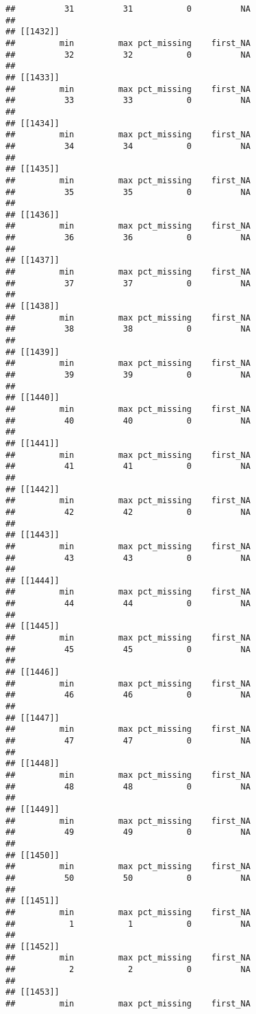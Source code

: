 \documentclass[
]{article}
\begin{document}
\begin{verbatim}
##          31          31           0          NA 
## 
## [[1432]]
##         min         max pct_missing    first_NA 
##          32          32           0          NA 
## 
## [[1433]]
##         min         max pct_missing    first_NA 
##          33          33           0          NA 
## 
## [[1434]]
##         min         max pct_missing    first_NA 
##          34          34           0          NA 
## 
## [[1435]]
##         min         max pct_missing    first_NA 
##          35          35           0          NA 
## 
## [[1436]]
##         min         max pct_missing    first_NA 
##          36          36           0          NA 
## 
## [[1437]]
##         min         max pct_missing    first_NA 
##          37          37           0          NA 
## 
## [[1438]]
##         min         max pct_missing    first_NA 
##          38          38           0          NA 
## 
## [[1439]]
##         min         max pct_missing    first_NA 
##          39          39           0          NA 
## 
## [[1440]]
##         min         max pct_missing    first_NA 
##          40          40           0          NA 
## 
## [[1441]]
##         min         max pct_missing    first_NA 
##          41          41           0          NA 
## 
## [[1442]]
##         min         max pct_missing    first_NA 
##          42          42           0          NA 
## 
## [[1443]]
##         min         max pct_missing    first_NA 
##          43          43           0          NA 
## 
## [[1444]]
##         min         max pct_missing    first_NA 
##          44          44           0          NA 
## 
## [[1445]]
##         min         max pct_missing    first_NA 
##          45          45           0          NA 
## 
## [[1446]]
##         min         max pct_missing    first_NA 
##          46          46           0          NA 
## 
## [[1447]]
##         min         max pct_missing    first_NA 
##          47          47           0          NA 
## 
## [[1448]]
##         min         max pct_missing    first_NA 
##          48          48           0          NA 
## 
## [[1449]]
##         min         max pct_missing    first_NA 
##          49          49           0          NA 
## 
## [[1450]]
##         min         max pct_missing    first_NA 
##          50          50           0          NA 
## 
## [[1451]]
##         min         max pct_missing    first_NA 
##           1           1           0          NA 
## 
## [[1452]]
##         min         max pct_missing    first_NA 
##           2           2           0          NA 
## 
## [[1453]]
##         min         max pct_missing    first_NA 

\end{verbatim}
\end{document}
